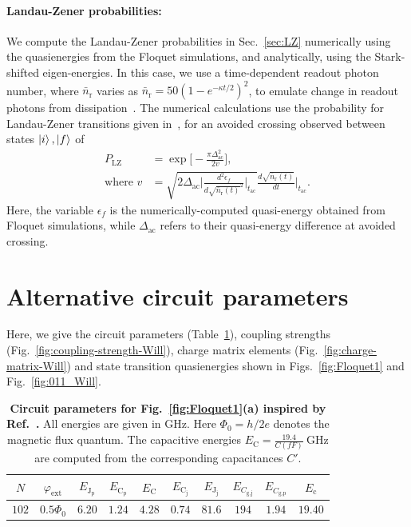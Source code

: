\documentclass[%
reprint,
superscriptaddress,
 amsmath,amssymb,
 aps,
 prx,
longbibliography,
floatfix,
]{revtex4-2}
\begin{document}
{\paragraph{Landau-Zener probabilities:}\label{app:LZ}
We compute the Landau-Zener probabilities in Sec.~\ref{sec:LZ} numerically using the quasienergies from the Floquet simulations, and analytically, using the Stark-shifted eigen-energies. In this case, we use a time-dependent readout photon number, where $\bar n_\textrm{r}$ varies as $\bar n_\textrm{r}=50(1-e^{-\kappa t/2})^2$, to emulate change in readout photons from dissipation~\cite{dumas2024unifie,khezri2023measurement}. The numerical calculations use the probability for Landau-Zener transitions given in~\cite{ikeda2022floquet}, for an avoided crossing observed between states $\ket{i},\ket{f}$ of
\begin{align}
    P_\textrm{LZ}&=\exp{\Big[-\frac{\pi \Delta_\textrm{ac}^2}{2v}\Big]},\\
    \text{where } v&=\sqrt{2\Delta_\textrm{ac}\Big|\frac{d^2\epsilon_f}{d\sqrt{\bar{n}_\textrm{r}(t)}^2}\Big|_{t_\textrm{ac}}}\frac{d\sqrt{\bar{n}_\textrm{r}(t)}}{dt}|_{t_\textrm{ac}}\Big .
\end{align}
Here, the variable $\epsilon_f$ is the numerically-computed quasi-energy obtained from Floquet simulations, while $\Delta_\textrm{ac}$ refers to their quasi-energy difference at avoided crossing. 

\section{Alternative circuit parameters}\label{app:alt_circuit1}
Here, we give the circuit parameters (Table~\ref{tab:circuit_params_Will}), coupling strengths (Fig.~\ref{fig:coupling-strength-Will}), charge matrix elements (Fig.~\ref{fig:charge-matrix-Will}) and state transition quasienergies shown in Figs.~\ref{fig:Floquet1} and Fig.~\ref{fig:011_Will}. 
\begin{table}[htb]
\centering
\begin{tabular}{|c|c|c|c|c|c|c|c|c|c|}
    \hline
     $N$ & $\varphi_{\textrm{ext}}$ & $E_{\textrm{J}_\textrm{p}}$ & $E_{\textrm{C}_\textrm{p}}$ & $E_{\textrm{C}}$ & $E_{\textrm{C}_\textrm{j}}$ & $E_{\textrm{J}_\textrm{j}}$ & $E_{C_\textrm{g,j}}$ & $E_{C_\textrm{g,p}}$ & $E_{\textrm{c}}$ \\
    \hline
    $102$ & $0.5\Phi_0$ & $6.20$ & $1.24$ & $4.28$ & $0.74$ & $81.6$ & $194$ & $1.94$ & $19.40$ \\
    \hline
\end{tabular}
\caption{\textbf{Circuit parameters for Fig.~\ref{fig:Floquet1}(a) inspired by Ref.~\cite{ding_high-fidelity_2023}.} All energies are given in GHz. Here $\Phi_0=h/2e$ denotes the magnetic flux quantum. The capacitive energies $E_{\textrm{C}}=\frac{19.4}{{C}(fF)} \ \mathrm{GHz}$ are computed from the corresponding capacitances $C'$.}
\label{tab:circuit_params_Will}
\end{table}

}
\end{document}
